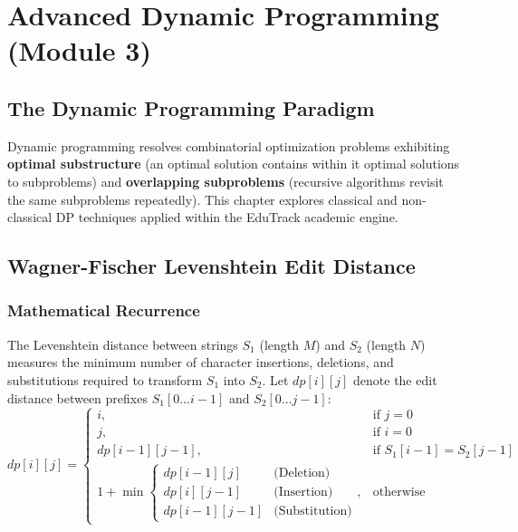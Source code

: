 \chapter{Advanced Dynamic Programming (Module 3)}
\label{ch:dynamic_programming}

\section{The Dynamic Programming Paradigm}
Dynamic programming resolves combinatorial optimization problems exhibiting \textbf{optimal substructure} (an optimal solution contains within it optimal solutions to subproblems) and \textbf{overlapping subproblems} (recursive algorithms revisit the same subproblems repeatedly). This chapter explores classical and non-classical DP techniques applied within the EduTrack academic engine.

\section{Wagner-Fischer Levenshtein Edit Distance}
\subsection{Mathematical Recurrence}
The Levenshtein distance between strings $S_1$ (length $M$) and $S_2$ (length $N$) measures the minimum number of character insertions, deletions, and substitutions required to transform $S_1$ into $S_2$. Let $dp[i][j]$ denote the edit distance between prefixes $S_1[0 \dots i-1]$ and $S_2[0 \dots j-1]$:
\begin{equation}
dp[i][j] = \begin{cases}
i, & \text{if } j = 0 \\
j, & \text{if } i = 0 \\
dp[i-1][j-1], & \text{if } S_1[i-1] = S_2[j-1] \\
1 + \min \begin{cases}
dp[i-1][j] & \text{(Deletion)} \\
dp[i][j-1] & \text{(Insertion)} \\
dp[i-1][j-1] & \text{(Substitution)}
\end{cases}, & \text{otherwise}
\end{cases}
\end{equation}

